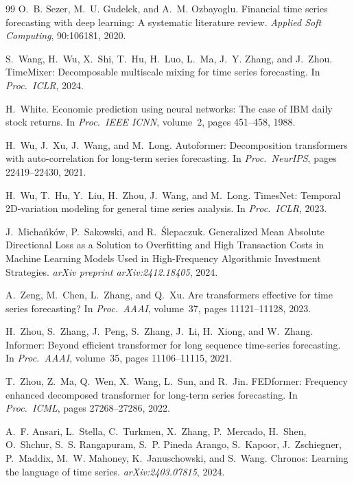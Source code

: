 \documentclass[11pt]{article}
\begin{document}
\begin{thebibliography}{99}
O.~B. Sezer, M.~U. Gudelek, and A.~M. Ozbayoglu.
Financial time series forecasting with deep learning: A systematic
literature review.
\emph{Applied Soft Computing}, 90:106181, 2020.

S.~Wang, H.~Wu, X.~Shi, T.~Hu, H.~Luo, L.~Ma, J.~Y. Zhang, and J.~Zhou.
TimeMixer: Decomposable multiscale mixing for time series forecasting.
In \emph{Proc.\ ICLR}, 2024.

H.~White.
Economic prediction using neural networks: The case of IBM daily stock
returns.
In \emph{Proc.\ IEEE ICNN}, volume~2, pages 451--458, 1988.

H.~Wu, J.~Xu, J.~Wang, and M.~Long.
Autoformer: Decomposition transformers with auto-correlation for long-term
series forecasting.
In \emph{Proc.\ NeurIPS}, pages 22419--22430, 2021.

H.~Wu, T.~Hu, Y.~Liu, H.~Zhou, J.~Wang, and M.~Long.
TimesNet: Temporal 2D-variation modeling for general time series analysis.
In \emph{Proc.\ ICLR}, 2023.

J.~Micha{\'n}k{\'o}w, P.~Sakowski, and R.~\'{S}lepaczuk.
Generalized Mean Absolute Directional Loss as a Solution to Overfitting and
High Transaction Costs in Machine Learning Models Used in High-Frequency
Algorithmic Investment Strategies.
\emph{arXiv preprint arXiv:2412.18405}, 2024.

A.~Zeng, M.~Chen, L.~Zhang, and Q.~Xu.
Are transformers effective for time series forecasting?
In \emph{Proc.\ AAAI}, volume~37, pages 11121--11128, 2023.

H.~Zhou, S.~Zhang, J.~Peng, S.~Zhang, J.~Li, H.~Xiong, and W.~Zhang.
Informer: Beyond efficient transformer for long sequence time-series
forecasting.
In \emph{Proc.\ AAAI}, volume~35, pages 11106--11115, 2021.

T.~Zhou, Z.~Ma, Q.~Wen, X.~Wang, L.~Sun, and R.~Jin.
FEDformer: Frequency enhanced decomposed transformer for long-term series
forecasting.
In \emph{Proc.\ ICML}, pages 27268--27286, 2022.


A.~F. Ansari, L.~Stella, C.~Turkmen, X.~Zhang, P.~Mercado, H.~Shen,
O.~Shchur, S.~S. Rangapuram, S.~P. Pineda Arango, S.~Kapoor,
J.~Zschiegner, P.~Maddix, M.~W. Mahoney, K.~Januschowski, and
S.~Wang.
Chronos: Learning the language of time series.
\emph{arXiv:2403.07815}, 2024.


\end{thebibliography}
\end{document}
